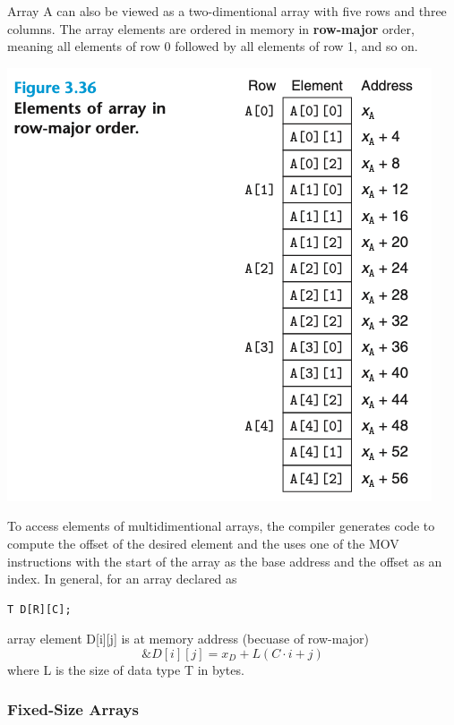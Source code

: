 \documentclass[11pt]{article}
\begin{document}
Array A can also be viewed as a two-dimentional array with five rows and three columns. The array elements are ordered in memory in \textbf{row-major} order, meaning all elements of row 0 followed by all elements of row 1, and so on.\\

\begin{center}
\includegraphics[width=.9\linewidth]{pics/elements-of-array-in-row-major-order.png}
\end{center}


To access elements of multidimentional arrays, the compiler generates code to compute the offset of the desired element and the uses one of the MOV instructions with the start of the array as the base address and the offset as an index. In general, for an array declared as\\
\begin{verbatim}
T D[R][C];
\end{verbatim}
array element D[i][j] is at memory address (becuase of row-major)\\
\begin{equation}
\&D[i][j] = x_D + L(C \cdot i + j)
\end{equation}
where L is the size of data type T in bytes.\\


\subsubsection{Fixed-Size Arrays}
\label{sec:org26aa0f6}
\end{document}
